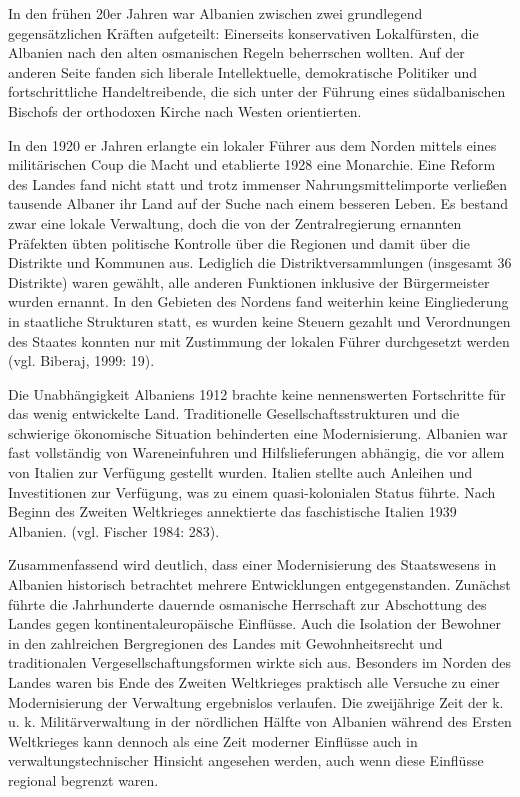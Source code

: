 In den frühen 20er Jahren war Albanien zwischen zwei grundlegend gegensätzlichen Kräften aufgeteilt: Einerseits konservativen Lokalfürsten, die Albanien nach den alten osmanischen Regeln beherrschen wollten. Auf der anderen Seite fanden sich liberale Intellektuelle, demokratische Politiker und fortschrittliche Handeltreibende, die sich unter der Führung eines südalbanischen Bischofs der orthodoxen Kirche nach Westen orientierten.\par
In den 1920 er Jahren erlangte ein lokaler Führer aus dem Norden mittels eines militärischen Coup die Macht und etablierte 1928 eine Monarchie. Eine Reform des Landes fand nicht statt und trotz immenser Nahrungsmittelimporte verließen tausende Albaner ihr Land auf der Suche nach einem besseren Leben. Es bestand zwar eine lokale Verwaltung, doch die von der Zentralregierung ernannten Präfekten übten politische Kontrolle über die Regionen und damit über die Distrikte und Kommunen aus. Lediglich die Distriktversammlungen (insgesamt 36 Distrikte) waren gewählt, alle anderen Funktionen inklusive der Bürgermeister wurden ernannt. In den Gebieten des Nordens fand weiterhin keine Eingliederung in staatliche Strukturen statt, es wurden keine Steuern gezahlt und Verordnungen des Staates konnten nur mit Zustimmung der lokalen Führer durchgesetzt werden (vgl. Biberaj, 1999: 19).\par
Die Unabhängigkeit Albaniens 1912 brachte keine nennenswerten Fortschritte für das wenig entwickelte Land. Traditionelle Gesellschaftsstrukturen und die schwierige ökonomische Situation behinderten eine Modernisierung. Albanien war fast vollständig von Wareneinfuhren und Hilfslieferungen abhängig, die vor allem von Italien zur Verfügung gestellt wurden. Italien stellte auch Anleihen und Investitionen zur Verfügung, was zu einem quasi-kolonialen Status führte. Nach Beginn des Zweiten Weltkrieges annektierte das faschistische Italien 1939 Albanien. (vgl. Fischer 1984: 283).
\par
Zusammenfassend wird deutlich, dass einer Modernisierung des Staatswesens in Albanien historisch betrachtet mehrere Entwicklungen entgegenstanden. Zunächst führte die Jahrhunderte dauernde osmanische Herrschaft zur Abschottung des Landes gegen kontinentaleuropäische Einflüsse. Auch die Isolation der Bewohner in den zahlreichen Bergregionen des Landes mit Gewohnheitsrecht und traditionalen Vergesellschaftungsformen wirkte sich aus. Besonders im Norden des Landes waren bis Ende des Zweiten Weltkrieges praktisch alle Versuche zu einer Modernisierung der Verwaltung ergebnislos verlaufen. Die zweijährige Zeit der k. u. k. Militärverwaltung in der nördlichen Hälfte von Albanien während des Ersten Weltkrieges kann dennoch als eine Zeit moderner Einflüsse auch in verwaltungstechnischer Hinsicht angesehen werden, auch wenn diese Einflüsse regional begrenzt waren.\par
